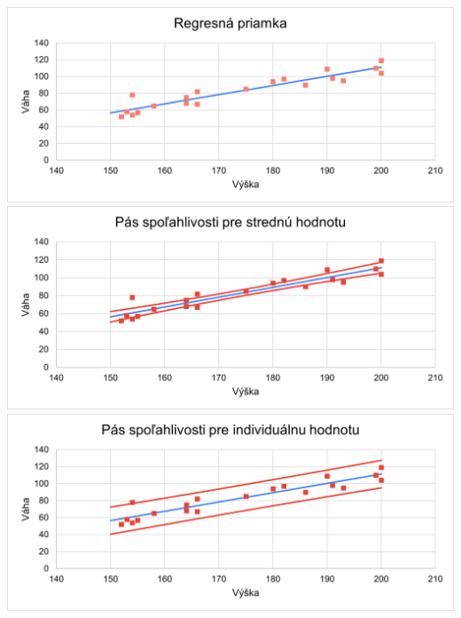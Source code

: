 \documentclass[pdftex, 11pt, a4paper, titlepage]{article}
\begin{document}
    \newpage
    \noindent
    \includegraphics[scale=0.85]{regresna_priamka.png}\\
    \includegraphics[scale=0.85]{pas_spolahl_pre_strednu_hodnotu.png}\\
    \includegraphics[scale=0.85]{pas_spolahl_pre_individualnu_hodnotu.png}\\
\end{document}
